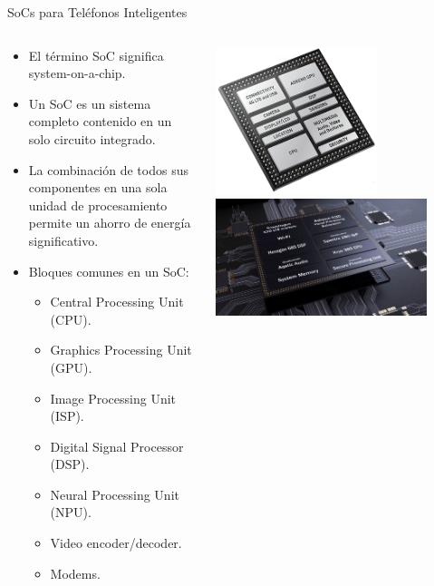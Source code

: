 \documentclass[aspectratio=169,compress]{beamer}
\begin{document}
\begin{frame}{SoCs para Teléfonos Inteligentes}
\begin{columns}
\begin{column}{0.60\textwidth}  
\begin{itemize}
\item El término SoC significa system-on-a-chip.
\item Un SoC es un sistema completo contenido en un solo circuito integrado.
\item La combinación de todos sus componentes en una sola unidad de procesamiento permite un ahorro de energía significativo. 
\item Bloques comunes en un SoC:
\begin{itemize}
\item Central Processing Unit (CPU).
\item Graphics Processing Unit (GPU).
\item Image Processing Unit (ISP).
\item Digital Signal Processor (DSP).
\item Neural Processing Unit (NPU).
\item Video encoder/decoder.
\item Modems.
\end{itemize}
\end{itemize}
\end{column}
\begin{column}{0.40\textwidth}  
    \begin{center}
\includegraphics[width=0.65\textwidth]{FigsOpenGL/qualcomm_snapdragon410_block}\\
\includegraphics[width=0.85\textwidth]{FigsOpenGL/Snapdragon-855-1}
     \end{center}
\end{column}
\end{columns}
\end{frame}
\end{document}
